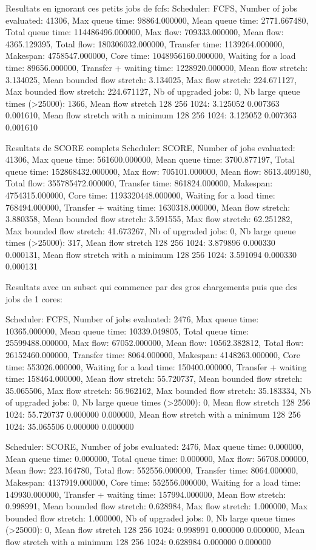 \documentclass[a4paper]{article}
\begin{document}
Resultats en ignorant ces petits jobs de fcfs: Scheduler: FCFS, Number of jobs evaluated: 41306, Max queue time: 98864.000000, Mean queue time: 2771.667480, Total queue time: 114486496.000000, Max flow: 709333.000000, Mean flow: 4365.129395, Total flow: 180306032.000000, Transfer time: 1139264.000000, Makespan: 4758547.000000, Core time: 1048956160.000000, Waiting for a load time: 89656.000000, Transfer + waiting time: 1228920.000000, Mean flow stretch: 3.134025, Mean bounded flow stretch: 3.134025, Max flow stretch: 224.671127, Max bounded flow stretch: 224.671127, Nb of upgraded jobs: 0, Nb large queue times (>25000): 1366, Mean flow stretch 128 256 1024: 3.125052 0.007363 0.001610, Mean flow stretch with a minimum 128 256 1024: 3.125052 0.007363 0.001610


Resultats de SCORE complets
Scheduler: SCORE, Number of jobs evaluated: 41306, Max queue time: 561600.000000, Mean queue time: 3700.877197, Total queue time: 152868432.000000, Max flow: 705101.000000, Mean flow: 8613.409180, Total flow: 355785472.000000, Transfer time: 861824.000000, Makespan: 4754315.000000, Core time: 1193320448.000000, Waiting for a load time: 768494.000000, Transfer + waiting time: 1630318.000000, Mean flow stretch: 3.880358, Mean bounded flow stretch: 3.591555, Max flow stretch: 62.251282, Max bounded flow stretch: 41.673267, Nb of upgraded jobs: 0, Nb large queue times (>25000): 317, Mean flow stretch 128 256 1024: 3.879896 0.000330 0.000131, Mean flow stretch with a minimum 128 256 1024: 3.591094 0.000330 0.000131

Resultats avec un subset qui commence par des gros chargements puis que des jobs de 1 cores:

Scheduler: FCFS, Number of jobs evaluated: 2476, Max queue time: 10365.000000, Mean queue time: 10339.049805, Total queue time: 25599488.000000, Max flow: 67052.000000, Mean flow: 10562.382812, Total flow: 26152460.000000, Transfer time: 8064.000000, Makespan: 4148263.000000, Core time: 553026.000000, Waiting for a load time: 150400.000000, Transfer + waiting time: 158464.000000, Mean flow stretch: 55.720737, Mean bounded flow stretch: 35.065506, Max flow stretch: 56.962162, Max bounded flow stretch: 35.183334, Nb of upgraded jobs: 0, Nb large queue times (>25000): 0, Mean flow stretch 128 256 1024: 55.720737 0.000000 0.000000, Mean flow stretch with a minimum 128 256 1024: 35.065506 0.000000 0.000000

Scheduler: SCORE, Number of jobs evaluated: 2476, Max queue time: 0.000000, Mean queue time: 0.000000, Total queue time: 0.000000, Max flow: 56708.000000, Mean flow: 223.164780, Total flow: 552556.000000, Transfer time: 8064.000000, Makespan: 4137919.000000, Core time: 552556.000000, Waiting for a load time: 149930.000000, Transfer + waiting time: 157994.000000, Mean flow stretch: 0.998991, Mean bounded flow stretch: 0.628984, Max flow stretch: 1.000000, Max bounded flow stretch: 1.000000, Nb of upgraded jobs: 0, Nb large queue times (>25000): 0, Mean flow stretch 128 256 1024: 0.998991 0.000000 0.000000, Mean flow stretch with a minimum 128 256 1024: 0.628984 0.000000 0.000000
\end{document}
